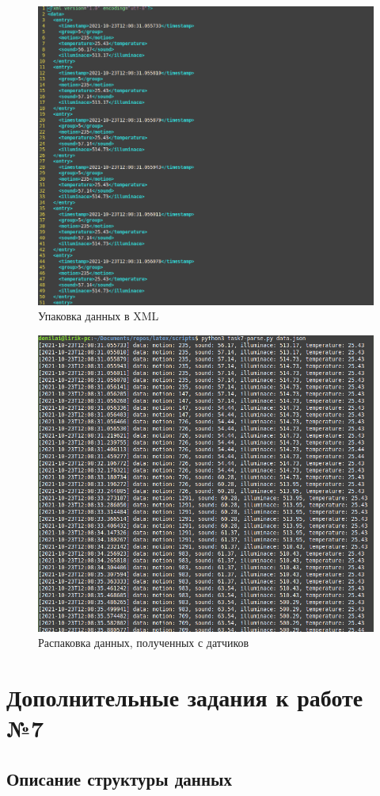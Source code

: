 \documentclass[a4paper,14pt]{extarticle}
\begin{document}
\begin{figure}[htpb]
	\centering
	\includegraphics[width=0.7\linewidth]{images/data.xml-cat}
	\caption{Упаковка данных в XML}
	\label{fig:data}
\end{figure}

\begin{figure}[h!]
	\centering
	\includegraphics[width=0.7\linewidth]{images/run-reparse}
	\caption{Распаковка данных, полученных с датчиков}
	\label{fig:run-reparse}
\end{figure}

\section{Дополнительные задания к работе №7}
\setcounter{problem}{0}
\subsection{Описание структуры данных}
\end{document}
